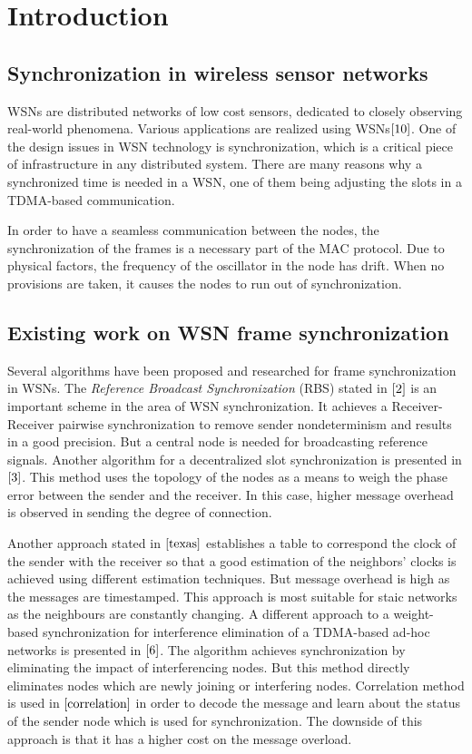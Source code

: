 \documentclass[journal]{IEEEtran}
\begin{document}
\section{\textbf{Introduction}}
\subsection{\textbf{Synchronization in wireless sensor networks}}
 WSNs are distributed networks of low cost sensors, dedicated to closely observing real-world phenomena.
 Various applications are realized using WSNs$\cite{10}$. One of the design issues in WSN technology is synchronization, which is a critical piece of infrastructure in any distributed system. There are many reasons why a synchronized time is needed in a WSN, one of them being adjusting the slots in a TDMA-based communication. \par
In order to have a seamless communication between the nodes, the synchronization of the frames is a necessary part of the MAC
protocol. Due to physical factors, the frequency of the oscillator in the node has drift. When no provisions are taken, it causes the nodes to run out of synchronization.
\subsection{\textbf{Existing work on WSN frame synchronization}}
 Several algorithms have been proposed and researched for
frame synchronization in WSNs. The \textit{Reference Broadcast
Synchronization} (RBS) stated in $\cite{2}$ is an important scheme
in the area of WSN synchronization. It achieves a Receiver-Receiver
pairwise synchronization to remove sender nondeterminism and results
in a good precision. But a central node is needed for broadcasting reference signals. Another algorithm for a decentralized slot
synchronization is presented in $\cite{3}$. This method uses the topology of the nodes as a means to weigh the phase error between the sender and the receiver. In this case, higher message overhead is observed in sending the degree of connection.
\par
Another approach stated in $\cite{texas}$ establishes a table to correspond
the clock of the sender with the receiver so that a
good estimation of the neighbors' clocks is achieved using different
estimation techniques. But message overhead is high as the messages are timestamped. This approach is most suitable for staic networks as the neighbours are constantly changing. A different approach to a weight-based
synchronization for interference elimination of a TDMA-based ad-hoc
networks is presented in $\cite{6}$. The algorithm achieves
synchronization by eliminating the impact of interferencing nodes. But this method directly eliminates nodes which are newly joining or interfering nodes.
Correlation method is used in $\cite{correlation}$ in order to
decode the message and learn about the status of the sender node
which is used for synchronization. The downside of this approach is that it has a higher cost on the message overload. 
\end{document}
